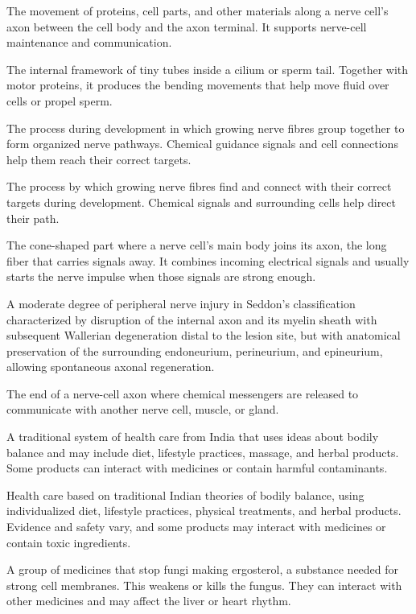  The movement of proteins, cell parts, and other materials along a nerve cell's axon between the cell body and the axon terminal. It supports nerve-cell maintenance and communication.

 The internal framework of tiny tubes inside a cilium or sperm tail. Together with motor proteins, it produces the bending movements that help move fluid over cells or propel sperm.

 The process during development in which growing nerve fibres group together to form organized nerve pathways. Chemical guidance signals and cell connections help them reach their correct targets.

 The process by which growing nerve fibres find and connect with their correct targets during development. Chemical signals and surrounding cells help direct their path.

 The cone-shaped part where a nerve cell's main body joins its axon, the long fiber that carries signals away. It combines incoming electrical signals and usually starts the nerve impulse when those signals are strong enough.

 A moderate degree of peripheral nerve injury in Seddon's classification characterized by disruption of the internal axon and its myelin sheath with subsequent Wallerian degeneration distal to the lesion site, but with anatomical preservation of the surrounding endoneurium, perineurium, and epineurium, allowing spontaneous axonal regeneration.

 The end of a nerve-cell axon where chemical messengers are released to communicate with another nerve cell, muscle, or gland.

 A traditional system of health care from India that uses ideas about bodily balance and may include diet, lifestyle practices, massage, and herbal products. Some products can interact with medicines or contain harmful contaminants.

 Health care based on traditional Indian theories of bodily balance, using individualized diet, lifestyle practices, physical treatments, and herbal products. Evidence and safety vary, and some products may interact with medicines or contain toxic ingredients.

 A group of medicines that stop fungi making ergosterol, a substance needed for strong cell membranes. This weakens or kills the fungus. They can interact with other medicines and may affect the liver or heart rhythm.


